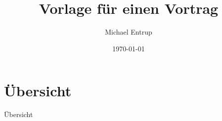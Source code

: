 \documentclass{beamer}
\title{Vorlage für einen Vortrag}
\author[M. Entrup]{Michael Entrup}
\date{\today}
\begin{document}
\frame{\titlepage}


\section*{Übersicht}
\begin{frame}{Übersicht}{}
\tableofcontents
\end{frame}




\end{document}
